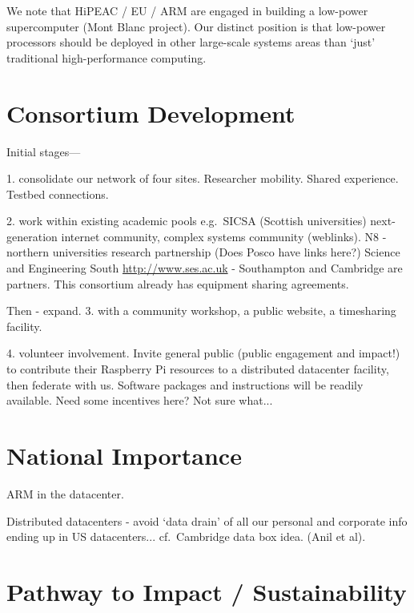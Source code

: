 \documentclass[a4paper,11pt]{article}
\begin{document}
We note that HiPEAC / EU / ARM are engaged in building a low-power supercomputer (Mont Blanc project). Our distinct position is that low-power processors should be deployed in other large-scale systems areas than `just' traditional high-performance computing.



\section{Consortium Development}


Initial stages---

1. consolidate our network of four sites. Researcher mobility. Shared experience. Testbed connections.

2. 
work within existing academic pools e.g.\ SICSA (Scottish universities) next-generation internet community, complex systems community (weblinks).
N8 - northern universities research partnership (Does Posco have links here?)
Science and Engineering South \url{http://www.ses.ac.uk} - Southampton and Cambridge are partners. This consortium already has equipment sharing agreements.

Then - expand.
3. with a community workshop, a public website, a timesharing facility.

4. volunteer involvement. Invite general public (public engagement and impact!) to contribute their Raspberry Pi resources to a distributed datacenter facility, then federate with us. Software packages and instructions will be readily available. Need some incentives here? Not sure what...



\section{National Importance}


ARM in the datacenter.

Distributed datacenters - avoid `data drain' of all our personal and corporate info ending up in US datacenters... cf.\ Cambridge data box idea. (Anil et al).


\section{Pathway to Impact / Sustainability}
\end{document}
